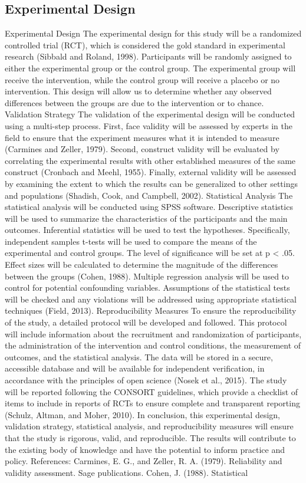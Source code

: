 \documentclass[conference]{IEEEtran}
\begin{document}
\subsection{Experimental Design}
Experimental Design The experimental design for this study will be a randomized controlled trial (RCT), which is considered the gold standard in experimental research (Sibbald and Roland, 1998). Participants will be randomly assigned to either the experimental group or the control group. The experimental group will receive the intervention, while the control group will receive a placebo or no intervention. This design will allow us to determine whether any observed differences between the groups are due to the intervention or to chance. Validation Strategy The validation of the experimental design will be conducted using a multi-step process. First, face validity will be assessed by experts in the field to ensure that the experiment measures what it is intended to measure (Carmines and Zeller, 1979). Second, construct validity will be evaluated by correlating the experimental results with other established measures of the same construct (Cronbach and Meehl, 1955). Finally, external validity will be assessed by examining the extent to which the results can be generalized to other settings and populations (Shadish, Cook, and Campbell, 2002). Statistical Analysis The statistical analysis will be conducted using SPSS software. Descriptive statistics will be used to summarize the characteristics of the participants and the main outcomes. Inferential statistics will be used to test the hypotheses. Specifically, independent samples t-tests will be used to compare the means of the experimental and control groups. The level of significance will be set at p < .05. Effect sizes will be calculated to determine the magnitude of the differences between the groups (Cohen, 1988). Multiple regression analysis will be used to control for potential confounding variables. Assumptions of the statistical tests will be checked and any violations will be addressed using appropriate statistical techniques (Field, 2013). Reproducibility Measures To ensure the reproducibility of the study, a detailed protocol will be developed and followed. This protocol will include information about the recruitment and randomization of participants, the administration of the intervention and control conditions, the measurement of outcomes, and the statistical analysis. The data will be stored in a secure, accessible database and will be available for independent verification, in accordance with the principles of open science (Nosek et al., 2015). The study will be reported following the CONSORT guidelines, which provide a checklist of items to include in reports of RCTs to ensure complete and transparent reporting (Schulz, Altman, and Moher, 2010). In conclusion, this experimental design, validation strategy, statistical analysis, and reproducibility measures will ensure that the study is rigorous, valid, and reproducible. The results will contribute to the existing body of knowledge and have the potential to inform practice and policy. References: Carmines, E. G., and Zeller, R. A. (1979). Reliability and validity assessment. Sage publications. Cohen, J. (1988). Statistical 
\end{document}
